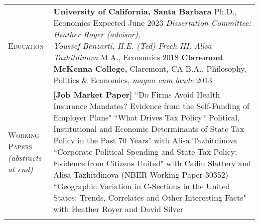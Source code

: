 \documentclass[11pt]{article}
\begin{document}
\begin{tabularx}{\textwidth}{@{}Y Z@{}}
	
	\textsc{Education} &
	\textbf{University of California, Santa Barbara}
	\vspace{3pt} \newline
	\hspace*{15pt} Ph.D., Economics \hfill Expected June 2023
	\vspace{3pt} \newline
	\hspace*{15pt} \textit{Dissertation Committee: Heather Royer (advisor), \newline \hspace*{15pt} Youssef Benzarti, H.E. (Ted) Frech III, Alisa Tazhitdinova} 
	\vspace{10pt} \newline
	\hspace*{15pt} M.A., Economics \hfill 2018
	\vspace{15pt} \newline
	\textbf{Claremont McKenna College,} Claremont, CA 
	\vspace{3pt} \newline
	\hspace*{15pt} B.A., Philosophy, Politics \& Economics, \textit{magna cum laude} \hfill 2013 
	\vspace{0pt}
   \\  \addlinespace[20pt] 

	\textsc{Working \newline Papers} \vspace{5pt} \newline \textit{(abstracts \newline at end)}& 
	 \textbf{[Job Market Paper]} ``Do Firms Avoid Health Insurance Mandates? \newline Evidence from the Self-Funding of Employer Plans"
	\vspace{12pt} \newline
	``What Drives Tax Policy? Political, Institutional and Economic Determinants \newline of State Tax Policy in the Past 70 Years" with Alisa Tazhitdinova 
	\vspace{12pt} \newline
	``Corporate Political Spending and State Tax Policy: Evidence from Citizens United" \newline with Cailin Slattery and Alisa Tazhitdinova (NBER Working Paper 30352)
	\vspace{12pt} \newline
	``Geographic Variation in C-Sections in the United States: Trends, Correlates \newline and Other Interesting Facts" with Heather Royer and David Silver 
     \\ \addlinespace[20pt] 
    

\end{tabularx}
\end{document}
